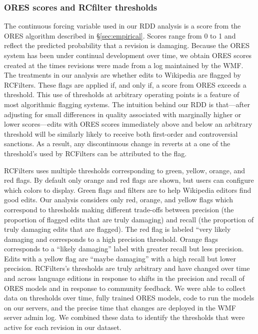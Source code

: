 \documentclass[format=acmsmall, natbib=true,  screen=true]{acmart}
\begin{document}
\subsubsection{ORES scores and RCfilter thresholds}
\label{sec:thresholds}


The continuous forcing variable used in our RDD analysis is a score from the ORES algorithm described in §\ref{sec:empirical}. Scores range from 0 to 1 and reflect the predicted probability that a revision is damaging. Because the ORES system has been under continual development over time, we obtain ORES scores created at the times revisions were made from a log maintained by the WMF.
The treatments in our analysis are whether edits to Wikipedia are flagged by RCFilters. These flags are applied if, and only if, a score from ORES exceeds a threshold.
This use of thresholds at arbitrary operating points is a feature of most algorithmic flagging systems.
The intuition behind our RDD is that---after adjusting for small differences in quality associated with marginally higher or lower scores---edits with ORES scores immediately above and below an arbitrary threshold will be similarly likely to receive both first-order and controversial sanctions. As a result, any discontinuous change in reverts at a one of the threshold's used by RCFilters can be attributed to the flag.

RCFilters uses multiple thresholds corresponding to green, yellow, orange, and red flags. By default only orange and red flags are shown, but users can configure which colors to display. Green flags and filters are to help Wikipedia editors find good edits. 
Our analysis considers only red, orange, and yellow flags which correspond to thresholds making different trade-offs between precision (the proportion of flagged edits that are truly damaging) and recall (the proportion of truly damaging edits that are flagged). The red flag is labeled ``very likely damaging and corresponds to a high precision threshold. Orange flags corresponds to a ``likely damaging'' label with greater recall but less precision. Edits with a yellow flag are ``maybe damaging'' with a high recall but lower precision.  
RCFilters's thresholds are truly arbitrary and have changed over time and across language editions in response to shifts in the precision and recall of ORES models and in response to community feedback.
We were able to collect data on thresholds over time, fully trained ORES models, code to run the models on our servers, and the precise time that changes are deployed in the WMF server admin log. We combined these data to identify the thresholds that were active for each revision in our dataset.
\end{document}
